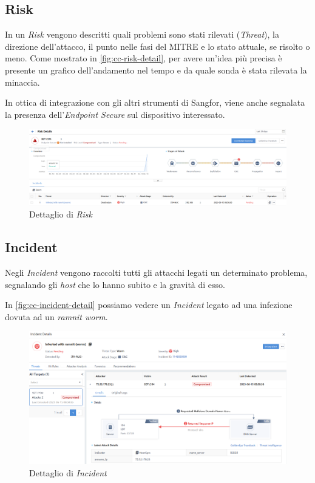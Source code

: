 \subsection{Risk}

In un \emph{Risk} vengono descritti quali problemi sono stati rilevati (\emph{Threat}), la direzione dell'attacco, il punto nelle fasi del MITRE e lo stato attuale, se risolto o meno. Come mostrato in \autoref{fig:cc-risk-detail}, per avere un'idea più precisa è presente un grafico dell'andamento nel tempo e da quale sonda è stata rilevata la minaccia. 

In ottica di integrazione con gli altri strumenti di Sangfor, viene anche segnalata la presenza dell'\emph{Endpoint Secure} sul dispositivo interessato.

\begin{figure}[!htbp]
    \centering
    \includegraphics[width=\linewidth]{images/ndr/risk-detail.png}
    \caption{Dettaglio di \emph{Risk}}
    \label{fig:cc-risk-detail}
\end{figure}

\subsection{Incident}

Negli \emph{Incident} vengono raccolti tutti gli attacchi legati un determinato problema, segnalando gli \emph{host} che lo hanno subito e la gravità di esso. 

In \autoref{fig:cc-incident-detail} possiamo vedere un \emph{Incident} legato ad una infezione dovuta ad un \emph{ramnit worm}.

\begin{figure}[!htbp]
    \centering
    \includegraphics[width=\linewidth]{images/ndr/incident-detail.png}
    \caption{Dettaglio di \emph{Incident}}
    \label{fig:cc-incident-detail}
\end{figure}

